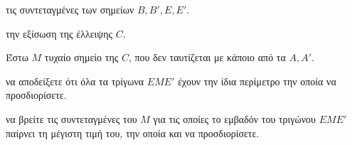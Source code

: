 \begin{alist}
    \item τις συντεταγμένες των σημείων $B, B', E, E'$. 
    \item την εξίσωση της έλλειψης $C$. 
    \item Έστω $M$ τυχαίο σημείο της $C$, που δεν ταυτίζεται με κάποιο από τα $A, A'$.
    \begin{rlist}
        \item να αποδείξετε ότι όλα τα τρίγωνα $EME'$ έχουν την ίδια περίμετρο την οποία να προσδιορίσετε. 
        \item να βρείτε τις συντεταγμένες του $M$ για τις οποίες το εμβαδόν του τριγώνου $EME'$ παίρνει τη μέγιστη τιμή του, την οποία και να προσδιορίσετε. 
    \end{rlist}
\end{alist}